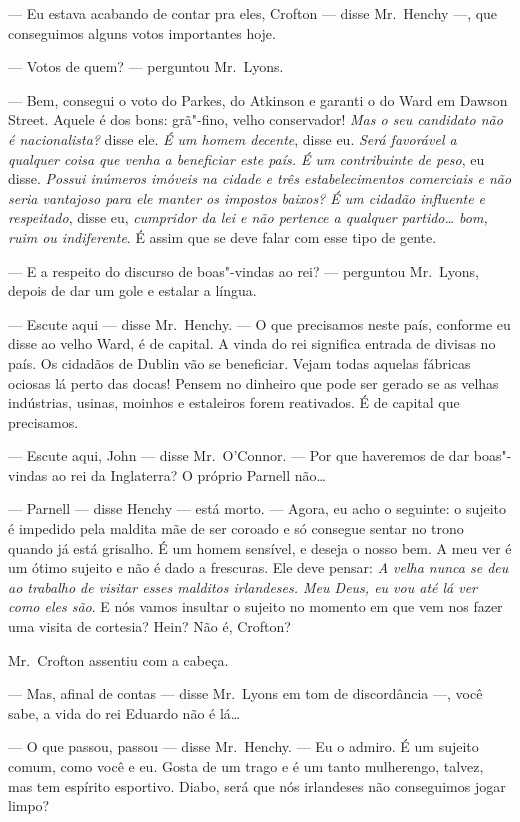 --- Eu estava acabando de contar pra eles, Crofton --- disse Mr.~Henchy ---,
que conseguimos alguns votos importantes hoje.

--- Votos de quem? --- perguntou Mr.~Lyons.

--- Bem, consegui o voto do Parkes, do Atkinson e garanti o do Ward em Dawson
Street.  Aquele é dos bons: grã"-fino, velho conservador!  \textit{Mas o seu
candidato não é nacionalista?} disse ele.  \textit{É um homem
decente}, disse eu.  \textit{Será favorável a qualquer coisa que venha a
beneficiar este país.  É um contribuinte de peso}, eu disse.  \textit{Possui
inúmeros imóveis na cidade e três estabelecimentos comerciais
e não seria vantajoso para ele manter os impostos baixos?  É
um cidadão influente e respeitado}, disse eu, \textit{cumpridor da lei e não
pertence a qualquer partido\ldots{} bom, ruim ou indiferente}.
É assim que se deve falar com esse tipo de gente.

--- E a respeito do discurso de boas"-vindas ao rei? --- perguntou Mr.~Lyons,
depois de dar um gole e estalar a língua.

--- Escute aqui --- disse Mr.~Henchy.  --- O que precisamos neste país,
conforme eu disse ao velho Ward, é de capital.  A vinda do rei significa
entrada de divisas no país.  Os cidadãos de Dublin vão se beneficiar.  Vejam
todas aquelas fábricas ociosas lá perto das docas!  Pensem no dinheiro que pode
ser gerado se as velhas indústrias, usinas, moinhos e estaleiros forem
reativados.  É de capital que precisamos.

--- Escute aqui, John --- disse Mr.~O’Connor.  --- Por que haveremos de dar
boas"-vindas ao rei da Inglaterra? O próprio Parnell não\ldots{}

--- Parnell --- disse Henchy --- está morto.  --- Agora, eu acho o seguinte: o
sujeito é impedido pela maldita mãe de ser coroado e só consegue sentar no
trono quando já está grisalho.  É um homem sensível, e deseja o nosso bem.  A
meu ver é um ótimo sujeito e não é dado a frescuras.  Ele deve pensar:
\textit{A velha nunca se deu ao trabalho de visitar esses malditos irlandeses.
Meu Deus, eu vou até lá ver como eles são}.  E nós vamos insultar o
sujeito no momento em que vem nos fazer uma visita de cortesia?  Hein?  Não é,
Crofton?

Mr.~Crofton assentiu com a cabeça.

--- Mas, afinal de contas --- disse Mr.~Lyons em tom de discordância ---, você
sabe, a vida do rei Eduardo não é lá\ldots{}

--- O que passou, passou --- disse Mr.~Henchy.  --- Eu o admiro.  É um sujeito
comum, como você e eu.  Gosta de um trago e é um tanto mulherengo, talvez, mas
tem espírito esportivo.  Diabo, será que nós irlandeses não conseguimos jogar
limpo?

